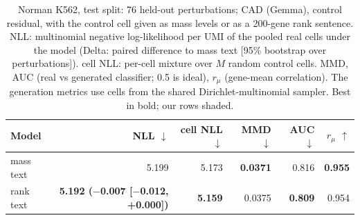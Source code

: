 \begin{table}[htbp]
\centering
\small
\setlength{\tabcolsep}{4pt}
\begin{tabular}{lrrrrr}
\toprule
Model & NLL $\downarrow$ & cell NLL $\downarrow$ & MMD $\downarrow$ & AUC $\downarrow$ & $r_\mu$ $\uparrow$ \\
\midrule
mass text & 5.199 & 5.173 & \textbf{0.0371} & 0.816 & \textbf{0.955} \\
\rowcolor{ours}rank text & \textbf{5.192 ($-$0.007 [$-$0.012, +0.000])} & \textbf{5.159} & 0.0375 & \textbf{0.809} & 0.954 \\
\bottomrule
\end{tabular}
\caption{Norman K562, test split: 76 held-out perturbations; CAD (Gemma), control residual, with the control cell given as mass levels or as a 200-gene rank sentence. NLL: multinomial negative log-likelihood per UMI of the pooled real cells under the model (Delta: paired difference to mass text [95\% bootstrap over perturbations]). cell NLL: per-cell mixture over $M$ random control cells. MMD, AUC (real vs generated classifier; 0.5 is ideal), $r_\mu$ (gene-mean correlation). The generation metrics use cells from the shared Dirichlet-multinomial sampler. Best in bold; our rows shaded.}
\label{tab:norman_test_rank_vs_mass}
\end{table}